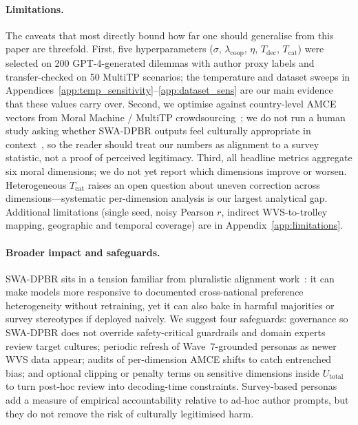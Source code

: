 \documentclass{article}
\begin{document}
\paragraph{Limitations.}
The caveats that most directly bound how far one should generalise from this
paper are threefold.
First, five hyperparameters ($\sigma$, $\lambda_{\text{coop}}$,
$\eta$, $T_{\text{dec}}$, $T_{\text{cat}}$) were selected on
200 GPT-4-generated dilemmas with author proxy labels and transfer-checked on
50 MultiTP scenarios; the temperature and dataset sweeps in
Appendices~\ref{app:temp_sensitivity}--\ref{app:dataset_sens} are our main
evidence that these values carry over.
Second, we optimise against country-level AMCE vectors from Moral Machine /
MultiTP crowdsourcing~\citep{awad2018moral,jin2025multitp}; we do not run a
human study asking whether SWA-DPBR outputs feel culturally appropriate in
context~\citep{atari2023humans}, so the reader should treat our numbers as
alignment to a survey statistic, not a proof of perceived legitimacy.
Third, all headline metrics aggregate six moral dimensions; we do not yet
report which dimensions improve or worsen. Heterogeneous $T_{\text{cat}}$ raises
an open question about uneven correction across dimensions---systematic
per-dimension analysis is our largest analytical gap.
Additional limitations (single seed, noisy Pearson $r$, indirect WVS-to-trolley
mapping, geographic and temporal coverage) are in Appendix~\ref{app:limitations}.

\paragraph{Broader impact and safeguards.}
SWA-DPBR sits in a tension familiar from pluralistic alignment
work~\citep{sorensen2024roadmap}: it can make models more responsive to
documented cross-national preference heterogeneity without retraining, yet it
can also bake in harmful majorities or survey stereotypes if deployed naively.
We suggest four safeguards: governance so SWA-DPBR does not override
safety-critical guardrails and domain experts review target cultures; periodic
refresh of Wave~7-grounded personas as newer WVS data appear; audits of
per-dimension AMCE shifts to catch entrenched bias; and optional clipping or
penalty terms on sensitive dimensions inside $U_{\text{total}}$ to turn
post-hoc review into decoding-time constraints.
Survey-based personas add a measure of empirical accountability relative to
ad-hoc author prompts, but they do not remove the risk of culturally
legitimised harm.
\end{document}
